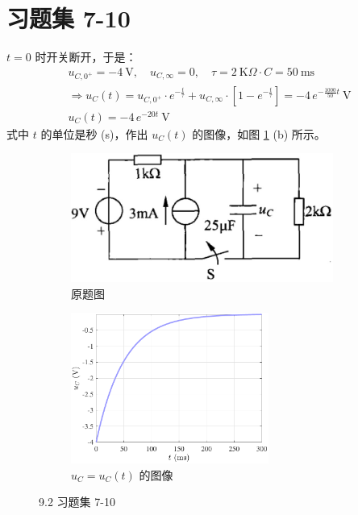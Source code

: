 \documentclass[UTF8]{report}
\def\kO{\ \mathrm{K}\Omega}
\theoremstyle{MyLineTheoremStyle} %
\theoremstyle{MyBlockTheoremStyle} %
\theoremstyle{MySubsubsectionStyle} %
\begin{document}
\section{习题集 7-10}
$t = 0$ 时开关断开，于是：
\begin{gather}
    u_{C,0^+}  = -4 \ \mathrm{V},\quad u_{C,\infty} = 0,\quad \tau = 2\kO \cdot C = 50 \ \mathrm{ms}  \\
    \Longrightarrow 
    u_C(t) = u_{C,0^+}\cdot e^{-\frac{t}{\tau}} + u_{C,\infty}\cdot \left[1 - e^{-\frac{t}{\tau}}\right] = -4 \,e^{- \frac{1000}{50} t} \ \mathrm{V} \\
    \boxed{
        u_C(t) = -4 \,e^{-20 t} \ \mathrm{V}
    }
\end{gather}
式中 $t$ 的单位是秒 (s)，作出 $u_C(t)$ 的图像，如图 \ref{9.2 习题集 7-10} (b) 所示。
\begin{figure}[H]\centering
\begin{subfigure}[b]{0.5\columnwidth}\centering
    \includegraphics[height=120pt]{assets/9/9.2 (a).png}
    \caption{原题图}
\end{subfigure}\hfill
\begin{subfigure}[b]{0.5\columnwidth}\centering
    \includegraphics[height=140pt]{assets/9/9.2 b.pdf}
    \caption{$u_C = u_C(t)$ 的图像}
\end{subfigure}
\caption{9.2 习题集 7-10}
\label{9.2 习题集 7-10}
\end{figure}
\end{document}
